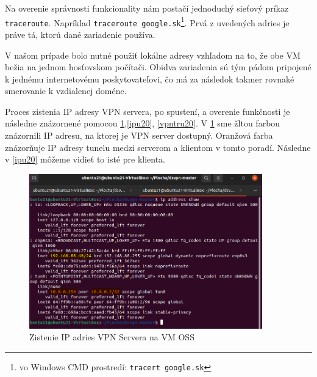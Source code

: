 Na overenie správnosti funkcionality nám postačí jednoduchý sieťový príkaz \lstinline|traceroute|. Napríklad \lstinline|traceroute google.sk|\footnote{vo Windows CMD prostredí: \lstinline|tracert google.sk|}. Prvá z uvedených adries je práve tá, ktorú dané zariadenie používa. 

V našom prípade bolo nutné použiť lokálne adresy vzhľadom na to, že obe VM bežia na jednom hosťovskom počítači. Obidva zariadenia sú tým pádom pripojené k jednému internetovému poskytovateľovi, čo má za následok takmer rovnaké smerovanie k vzdialenej doméne. 

Proces zistenia IP adresy VPN servera, po spustení, a overenie funkčnosti je následne znázornené pomocou \ref{ipu21},\ref{ipu20}, \ref{vpntru20}.
V  \ref{ipu21} sme žltou farbou znázornili IP adresu, na ktorej je VPN server dostupný. Oranžová farba znázorňuje IP adresy tunelu medzi serverom a klientom v tomto poradí. Následne v \ref{ipu20} môžeme vidieť to isté pre klienta.
  \begin{figure}
  	\centering
  	\includegraphics[width=0.9\textwidth]{figures/ipu21}
  	\caption{Zistenie IP adries VPN Servera na VM OSS}
  	\label{ipu21}
  \end{figure}
  

